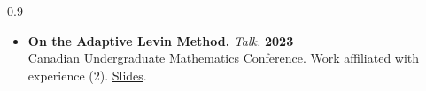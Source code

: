 \documentclass{article}
\begin{document}
\begin{spacing}{0.9}
{\begin{itemize}[itemsep=0.1em, parsep=0.2em, topsep=0.1em]
    \item \textbf{On the Adaptive Levin Method.} \emph{Talk.} \hspace{\fill} \textbf{2023}\\
    Canadian Undergraduate Mathematics Conference. Work affiliated with experience (2). \href{murdockaubry.com/academia/CUMC_slides.pdf}{\color{blue} Slides}.

\end{itemize}
}
\vspace{0.10cm}










\end{spacing}
\end{document}

